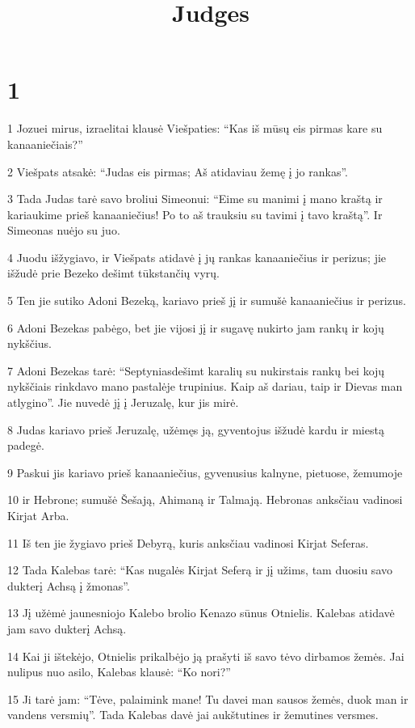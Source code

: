 

\title{Judges}

\chapter{1}

\par 1 Jozuei mirus, izraelitai klausė Viešpaties: “Kas iš mūsų eis pirmas kare su kanaaniečiais?” 
\par 2 Viešpats atsakė: “Judas eis pirmas; Aš atidaviau žemę į jo rankas”. 
\par 3 Tada Judas tarė savo broliui Simeonui: “Eime su manimi į mano kraštą ir kariaukime prieš kanaaniečius! Po to aš trauksiu su tavimi į tavo kraštą”. Ir Simeonas nuėjo su juo. 
\par 4 Juodu išžygiavo, ir Viešpats atidavė į jų rankas kanaaniečius ir perizus; jie išžudė prie Bezeko dešimt tūkstančių vyrų. 
\par 5 Ten jie sutiko Adoni Bezeką, kariavo prieš jį ir sumušė kanaaniečius ir perizus. 
\par 6 Adoni Bezekas pabėgo, bet jie vijosi jį ir sugavę nukirto jam rankų ir kojų nykščius. 
\par 7 Adoni Bezekas tarė: “Septyniasdešimt karalių su nukirstais rankų bei kojų nykščiais rinkdavo mano pastalėje trupinius. Kaip aš dariau, taip ir Dievas man atlygino”. Jie nuvedė jį į Jeruzalę, kur jis mirė. 
\par 8 Judas kariavo prieš Jeruzalę, užėmęs ją, gyventojus išžudė kardu ir miestą padegė. 
\par 9 Paskui jis kariavo prieš kanaaniečius, gyvenusius kalnyne, pietuose, žemumoje 
\par 10 ir Hebrone; sumušė Šešają, Ahimaną ir Talmają. Hebronas anksčiau vadinosi Kirjat Arba. 
\par 11 Iš ten jie žygiavo prieš Debyrą, kuris anksčiau vadinosi Kirjat Seferas. 
\par 12 Tada Kalebas tarė: “Kas nugalės Kirjat Seferą ir jį užims, tam duosiu savo dukterį Achsą į žmonas”. 
\par 13 Jį užėmė jaunesniojo Kalebo brolio Kenazo sūnus Otnielis. Kalebas atidavė jam savo dukterį Achsą. 
\par 14 Kai ji ištekėjo, Otnielis prikalbėjo ją prašyti iš savo tėvo dirbamos žemės. Jai nulipus nuo asilo, Kalebas klausė: “Ko nori?” 
\par 15 Ji tarė jam: “Tėve, palaimink mane! Tu davei man sausos žemės, duok man ir vandens versmių”. Tada Kalebas davė jai aukštutines ir žemutines versmes. 
